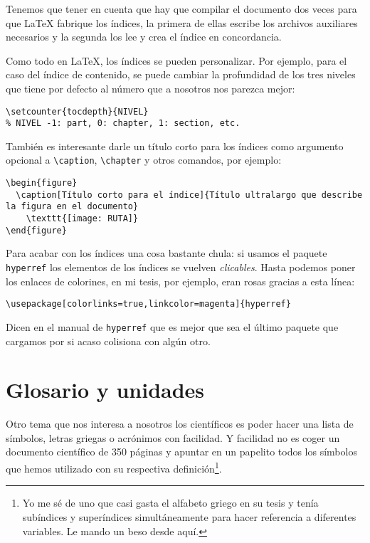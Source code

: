 Tenemos que tener en cuenta que hay que compilar el documento dos veces
para que LaTeX fabrique los índices, la primera de ellas escribe los
archivos auxiliares necesarios y la segunda los lee y crea el índice en
concordancia.

Como todo en LaTeX, los índices se pueden personalizar. Por ejemplo,
para el caso del índice de contenido, se puede cambiar la profundidad de
los tres niveles que tiene por defecto al número que a nosotros nos
parezca mejor:

\begin{lstlisting}[language={[latex]tex}]
\setcounter{tocdepth}{NIVEL}
% NIVEL -1: part, 0: chapter, 1: section, etc.
\end{lstlisting}

También es interesante darle un título corto para los índices como
argumento opcional a \lstinline!\caption!, \lstinline!\chapter! y otros
comandos, por ejemplo:

\begin{lstlisting}[language={[latex]tex}]
\begin{figure}
  \caption[Título corto para el índice]{Título ultralargo que describe la figura en el documento}
    \texttt{[image: RUTA]}
\end{figure}
\end{lstlisting}

Para acabar con los índices una cosa bastante chula: si usamos el
paquete \lstinline!hyperref! los elementos de los índices se vuelven
\emph{clicables}. Hasta podemos poner los enlaces de colorines, en mi
tesis, por ejemplo, eran rosas gracias a esta línea:

\begin{lstlisting}[language={[latex]tex}]
\usepackage[colorlinks=true,linkcolor=magenta]{hyperref}
\end{lstlisting}

Dicen en el manual de \lstinline!hyperref! que es mejor que sea el
último paquete que cargamos por si acaso colisiona con algún otro.

\section{Glosario y unidades}

Otro tema que nos interesa a nosotros los científicos es poder hacer una
lista de símbolos, letras griegas o acrónimos con facilidad. Y facilidad
no es coger un documento científico de 350 páginas y apuntar en un
papelito todos los símbolos que hemos utilizado con su respectiva
definición\footnote{Yo me sé de uno que casi gasta el alfabeto griego en
  su tesis y tenía subíndices y superíndices simultáneamente para hacer
  referencia a diferentes variables. Le mando un beso desde aquí.}.

